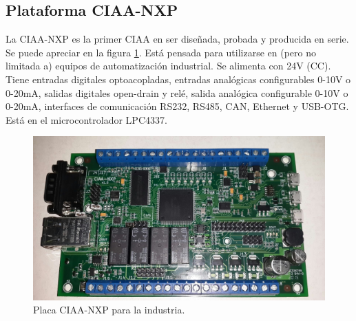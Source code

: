 \subsection{Plataforma CIAA-NXP}

La CIAA-NXP es la primer CIAA en ser diseñada, probada y producida en serie. Se puede apreciar en la figura \ref{fig:ciaaxp}. 
Está pensada para utilizarse en (pero no limitada a) equipos de automatización industrial. Se alimenta con 24V (CC). Tiene entradas digitales optoacopladas, entradas analógicas configurables 0-10V o 0-20mA, salidas digitales open-drain y relé, salida analógica configurable 0-10V o 0-20mA, interfaces de comunicación RS232, RS485, CAN, Ethernet y USB-OTG. Está en el microcontrolador LPC4337. 

\begin{figure}[ht]
  \centering
  \includegraphics[scale=.2]{./Figures/ciaa.png}
  \caption{Placa CIAA-NXP para la industria.}
  \label{fig:ciaaxp}
\end{figure}

